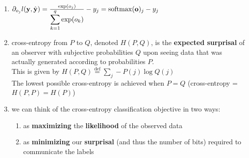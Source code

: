 \begin{enumerate}[itemsep=0.2cm]
    \item $
        \partial_{o_j} l(\mathbf{y}, \hat{\mathbf{y}}) 
        = \frac{\exp(o_j)}{\displaystyle\sum_{k=1}^q \exp(o_k)} - y_j 
        = \mathrm{softmax}(\mathbf{o})_j - y_j
    $

    \item cross-entropy from $P$ to $Q$, denoted $H(P, Q)$, is the \textbf{expected surprisal} of an observer with subjective probabilities $Q$ upon seeing data that was actually generated according to probabilities $P$.\\
    This is given by $H(P, Q) \stackrel{\textrm{def}}{=} \sum_j - P(j) \log Q(j)$\\
    The lowest possible cross-entropy is achieved when $P=Q$ (cross-entropy = $H(P,P)=H(P)$)


    \item we can think of the cross-entropy classification objective in two ways: 
    \begin{enumerate}
        \item as \textbf{maximizing} the \textbf{likelihood} of the observed data
        
        \item as \textbf{minimizing} our \textbf{surprisal} (and thus the number of bits) required to communicate the labels
    \end{enumerate}

\end{enumerate}














































